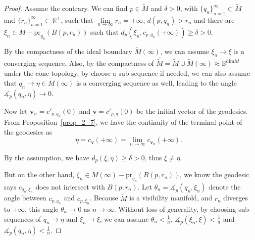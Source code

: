 \documentclass[reqno,11pt]{article}
\theoremstyle{definition}
\theoremstyle{remark}
\numberwithin{equation}{section}
\begin{document}
\begin{proof}
	Assume the contrary. We can find $p\in\widetilde{M}$ and $\delta>0$, with ${\{q_n\}}_{n=1}^\infty\subset\widetilde{M}$ and ${\{r_n\}}_{n=1}^\infty\subset\mathbb{R}^+$, such that $\lim\limits_{n\to\infty}r_n=+\infty$, $d(p,q_n)>r_n$ and there are $\xi_n\in\widetilde{M}-\text{pr}_{q_n}(B(p,r_n))$ such that $d_p(\xi_n,c_{p,q_n}(+\infty))\geq\delta>0$.

	By the compactness of the ideal boundary $\widetilde{M}(\infty)$, we can assume $\xi_n\to\xi$ is a converging sequence. Also, by the compactness of $\overline{\widetilde{M}}=\widetilde{M}\cup\widetilde{M}(\infty)\approx \mathbb{B}^{\text{dim}\widetilde{M}}$ under the cone topology, by choose a sub-sequence if needed, we can also assume that $q_n\to\eta\in\widetilde{M}(\infty)$ is a converging sequence as well, leading to the angle $\measuredangle_p(q_n,\eta)\to 0$.

	Now let $\bm{v}_n=c'_{p,q_n}(0)$ and $\bm{v}=c'_{p,q}(0)$ be the initial vector of the geodesics. From Proposition~\ref{prop_2_7}, we have the continuity of the terminal point of the geodesics as
	\begin{displaymath}
		\eta=c_{\bm{v}}(+\infty)=\lim_{n\to\infty}c_{\bm{v}_n}(+\infty).
	\end{displaymath}

	By the assumption, we have $d_p(\xi,\eta)\geq\delta>0$, thus $\xi\neq\eta$.

	But on the other hand, $\xi_n\in\widetilde{M}(\infty)-\text{pr}_{q_n}(B(p,r_n))$, we know the geodesic rays $c_{q_n,\xi_n}$ does not intersect with $B(p,r_n)$. Let $\theta_n=\measuredangle_p(q_n,\xi_n)$ denote the angle between $c_{p,q_n}$ and $c_{p,\xi_n}$. Because $\widetilde{M}$ is a visibility manifold, and $r_n$ diverges to $+\infty$, this angle $\theta_n\to 0$ as $n\to\infty$. Without loss of generality, by choosing sub-sequences of $q_n\to\eta$ and $\xi_n\to\xi$, we can assume $\theta_n<\frac 1n$, $\measuredangle_p(\xi_n,\xi)<\frac 1n$ and $\measuredangle_p(q_n,\eta)<\frac 1n$.


\end{proof}
\end{document}
